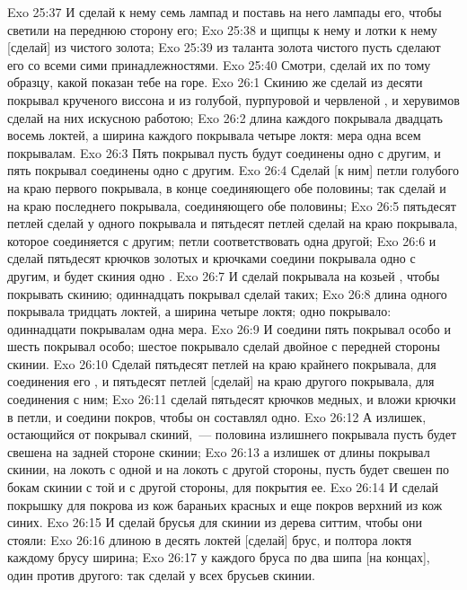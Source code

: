 \vs Exo 25:37 И сделай к нему семь лампад и поставь на него лампады его, чтобы светили на переднюю сторону его;
\vs Exo 25:38 и щипцы к нему и лотки к нему [сделай] из чистого золота;
\vs Exo 25:39 из таланта золота чистого пусть сделают его со всеми сими принадлежностями.
\vs Exo 25:40 Смотри, сделай их по тому образцу, какой показан тебе на горе.
\vs Exo 26:1 Скинию же сделай из десяти покрывал крученого виссона и из голубой, пурпуровой и червленой , и херувимов сделай на них искусною работою;
\vs Exo 26:2 длина каждого покрывала двадцать восемь локтей, а ширина каждого покрывала четыре локтя: мера одна всем покрывалам.
\vs Exo 26:3 Пять покрывал пусть будут соединены одно с другим, и  пять покрывал соединены одно с другим.
\vs Exo 26:4 Сделай [к ним] петли голубого  на краю первого покрывала, в конце соединяющего обе половины; так сделай и на краю последнего покрывала, соединяющего обе половины;
\vs Exo 26:5 пятьдесят петлей сделай у одного покрывала и пятьдесят петлей сделай на краю покрывала, которое соединяется с другим; петли  соответствовать одна другой;
\vs Exo 26:6 и сделай пятьдесят крючков золотых и крючками соедини покрывала одно с другим, и будет скиния одно .
\vs Exo 26:7 И сделай покрывала на козьей , чтобы покрывать скинию; одиннадцать покрывал сделай таких;
\vs Exo 26:8 длина одного покрывала тридцать локтей, а ширина четыре локтя;  одно покрывало: одиннадцати покрывалам одна мера.
\vs Exo 26:9 И соедини пять покрывал особо и шесть покрывал особо; шестое покрывало сделай двойное с передней стороны скинии.
\vs Exo 26:10 Сделай пятьдесят петлей на краю крайнего покрывала, для соединения его , и пятьдесят петлей [сделай] на краю другого покрывала, для соединения с ним;
\vs Exo 26:11 сделай пятьдесят крючков медных, и вложи крючки в петли, и соедини покров, чтобы он составлял одно.
\vs Exo 26:12 А излишек, остающийся от покрывал скиний,~--- половина излишнего покрывала пусть будет свешена на задней стороне скинии;
\vs Exo 26:13 а излишек от длины покрывал скинии, на локоть с одной и на локоть с другой стороны, пусть будет свешен по бокам скинии с той и с другой стороны, для покрытия ее.
\vs Exo 26:14 И сделай покрышку для покрова из кож бараньих красных и еще покров верхний из кож синих.
\rsbpar\vs Exo 26:15 И сделай брусья для скинии из дерева ситтим, чтобы они стояли:
\vs Exo 26:16 длиною в десять локтей [сделай] брус, и полтора локтя каждому брусу ширина;
\vs Exo 26:17 у каждого бруса по два шипа [на концах], один против другого: так сделай у всех брусьев скинии.
